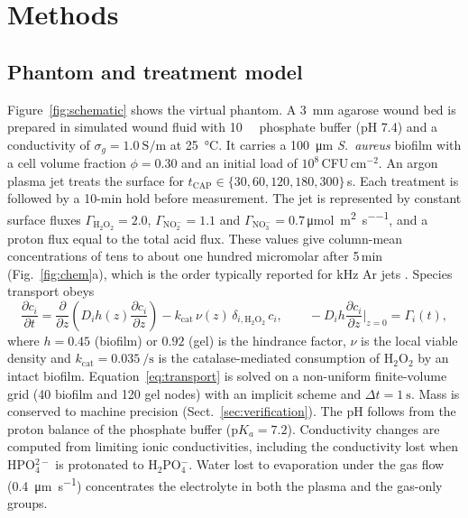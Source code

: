 \documentclass[pdflatex,sn-mathphys-num]{sn-jnl}%
\begin{document}
\section{Methods}\label{sec:methods}

\subsection{Phantom and treatment model}\label{sec:phantom}

Figure~\ref{fig:schematic} shows the virtual phantom. A \SI{3}{\milli\metre} agarose wound bed is prepared in simulated wound fluid with \SI{10}{\milli\molar} phosphate buffer (pH 7.4) and a conductivity of $\sigma_g = \SI{1.0}{\siemens\per\metre}$ at \SI{25}{\celsius}. It carries a \SI{100}{\micro\metre} \textit{S.~aureus} biofilm with a cell volume fraction $\phi = 0.30$ and an initial load of $10^{8}$\,CFU\,cm$^{-2}$. An argon plasma jet treats the surface for $t_{\mathrm{CAP}} \in \{30, 60, 120, 180, 300\}$\,s. Each treatment is followed by a 10-min hold before measurement. The jet is represented by constant surface fluxes $\Gamma_{\mathrm{H_2O_2}} = 2.0$, $\Gamma_{\mathrm{NO_2^-}} = 1.1$ and $\Gamma_{\mathrm{NO_3^-}} = 0.7$\,\si{\micro\mol\per\square\metre\per\second}, and a proton flux equal to the total acid flux. These values give column-mean concentrations of tens to about one hundred micromolar after 5\,min (Fig.~\ref{fig:chem}a), which is the order typically reported for kHz Ar jets \cite{lu2016,bagheri2023}. Species transport obeys
\begin{equation}
\frac{\partial c_i}{\partial t} = \frac{\partial}{\partial z}\!\left(D_i h(z) \frac{\partial c_i}{\partial z}\right) - k_{\mathrm{cat}}\, \nu(z)\, \delta_{i,\mathrm{H_2O_2}}\, c_i,
\qquad -D_i h \frac{\partial c_i}{\partial z}\Big|_{z=0} = \Gamma_i(t),
\label{eq:transport}
\end{equation}
where $h=0.45$ (biofilm) or $0.92$ (gel) is the hindrance factor, $\nu$ is the local viable density and $k_{\mathrm{cat}}=\SI{0.035}{\per\second}$ is the catalase-mediated consumption of H$_2$O$_2$ by an intact biofilm. Equation~\eqref{eq:transport} is solved on a non-uniform finite-volume grid (40 biofilm and 120 gel nodes) with an implicit scheme and $\Delta t=\SI{1}{\second}$. Mass is conserved to machine precision (Sect.~\ref{sec:verification}). The pH follows from the proton balance of the phosphate buffer ($\mathrm{p}K_a=7.2$). Conductivity changes are computed from limiting ionic conductivities, including the conductivity lost when HPO$_4^{2-}$ is protonated to H$_2$PO$_4^-$. Water lost to evaporation under the gas flow (\SI{0.4}{\micro\metre\per\second}) concentrates the electrolyte in both the plasma and the gas-only groups.
\end{document}
